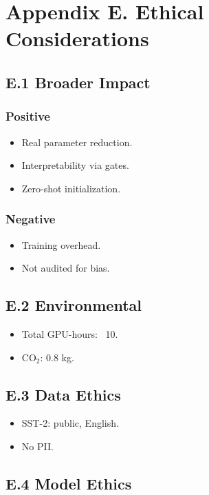 \section{Appendix E. Ethical Considerations}

\subsection{E.1 Broader Impact}

\subsubsection{Positive}
\begin{itemize}
\item Real parameter reduction.
\item Interpretability via gates.
\item Zero-shot initialization.

\end{itemize}
\subsubsection{Negative}
\begin{itemize}
\item Training overhead.
\item Not audited for bias.

\end{itemize}
\subsection{E.2 Environmental}

\begin{itemize}
\item Total GPU-hours: ~10.
\item CO$_2$: 0.8 kg.

\end{itemize}
\subsection{E.3 Data Ethics}

\begin{itemize}
\item SST-2: public, English.
\item No PII.

\end{itemize}
\subsection{E.4 Model Ethics}

